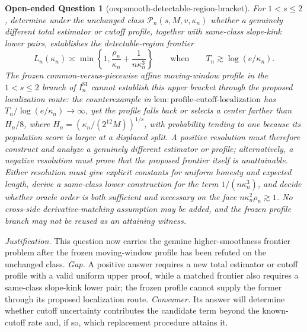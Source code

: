 \documentclass{article}
\newtheorem{openendedquestion}{Open-ended Question}
\begin{document}
\begin{openendedquestion}[oeq:smooth-detectable-region-bracket]\label{oeq:smooth-detectable-region-bracket}
For \(1<s\le2\), determine under the unchanged class
\(\mathcal P_n(s,M,v,\kappa_n)\) whether a genuinely different total
estimator or cutoff profile, together with same-class slope-kink lower
pairs, establishes the detectable-region frontier
\[
 L_n(\kappa_n)\asymp
 \min\left\{1,\frac{\rho_n}{\kappa_n}
                  +\frac1{n\kappa_n^3}\right\}
 \qquad\text{when}\qquad
 T_n\gtrsim\log(e/\kappa_n).
\]
The frozen common-versus-piecewise affine moving-window profile in the
\(1<s\le2\) branch of \(I_n^{\mathrm{SI}}\) cannot establish this upper
bracket through the proposed localization route:
the counterexample in
\(\mathrm{lem:profile\mbox{-}cutoff\mbox{-}localization}\) has
\(T_n/\log(e/\kappa_n)\to\infty\), yet the profile falls back or selects
a center farther than \(H_n/8\), where
\(H_n=(\kappa_n/(2^{12}M))^{1/s}\), with probability tending to one
because its population score is larger at a displaced split.  A positive
resolution must therefore construct and analyze a genuinely different
estimator or profile; alternatively, a negative resolution must prove
that the proposed frontier itself is unattainable.  Either resolution
must give explicit constants for uniform honesty and expected length,
derive a same-class lower construction for the term
\(1/(n\kappa_n^3)\), and decide whether oracle order is both sufficient
and necessary on the face \(n\kappa_n^2\rho_n\gtrsim1\).  No
cross-side derivative-matching assumption may be added, and the frozen
profile branch may not be reused as an attaining witness.
\end{openendedquestion}
\par\smallskip\noindent \textit{Justification.} This question now carries the genuine higher-smoothness frontier problem after the frozen moving-window profile has been refuted on the unchanged class. \textit{Gap.} A positive answer requires a new total estimator or cutoff profile with a valid uniform upper proof, while a matched frontier also requires a same-class slope-kink lower pair; the frozen profile cannot supply the former through its proposed localization route. \textit{Consumer.} Its answer will determine whether cutoff uncertainty contributes the candidate term beyond the known-cutoff rate and, if so, which replacement procedure attains it.
\end{document}
